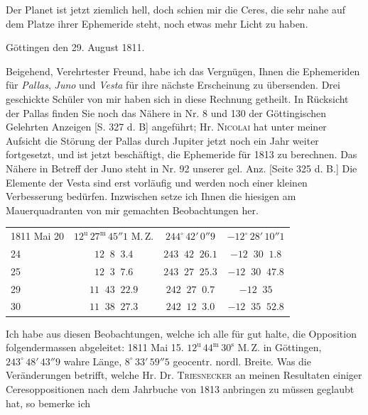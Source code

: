 \par\indent Der Planet ist jetzt ziemlich hell, doch schien mir die Ceres, die sehr nahe auf dem Platze ihrer Ephemeride steht, noch etwas mehr Licht zu haben.
\par{}\bigskip
\begin{flushright}Göttingen den 29. August 1811.\end{flushright}
\par\indent Beigehend, Verehrtester Freund, habe ich das Vergnügen, Ihnen die Ephemeriden für \emph{Pallas}, \emph{Juno} und \emph{Vesta} für ihre nächste Erscheinung zu übersenden. Drei geschickte Schüler von mir haben sich in diese Rechnung getheilt. In Rücksicht der Pallas finden Sie noch das Nähere in Nr. 8 und 130 der Göttingischen Gelehrten Anzeigen [S. 327 d. B] angeführt; Hr. \textsc{Nicolai} hat unter meiner Aufsicht die Störung der Pallas durch Jupiter jetzt noch ein Jahr weiter fortgesetzt, und ist jetzt beschäftigt, die Ephemeride für 1813 zu berechnen. Das Nähere in Betreff der Juno steht in Nr. 92 unserer gel. Anz. [Seite 325 d. B.] Die Elemente der Vesta sind erst vorläufig und werden noch einer kleinen Verbesserung bedürfen. Inzwischen setze ich Ihnen die hiesigen am Mauerquadranten von mir gemachten Beobachtungen her.
\begin{center}\fontsize{10}{12}\selectfont\setlength{\tabcolsep}{4pt}\renewcommand{\arraystretch}{1.15}
\begin{tabular}{l|c|c|c}
1811 Mai 20 & $12^{\mathrm u}\,27^{\mathrm m}\,45''1$ M.\,Z. & $244^\circ\,42'\,0''9$ & $-12^\circ\,28'\,10''1$ \\
\phantom{1811 Mai }24 & $12\;\;8\;\;3.4$ & $243\;\;42\;\;26.1$ & $-12\;\;30\;\;1.8$ \\
\phantom{1811 Mai }25 & $12\;\;3\;\;7.6$ & $243\;\;27\;\;25.3$ & $-12\;\;30\;\;47.8$ \\
\phantom{1811 Mai }29 & $11\;\;43\;\;22.9$ & $242\;\;27\;\;0.7$ & $-12\;\;35$ \\
\phantom{1811 Mai }30 & $11\;\;38\;\;27.3$ & $242\;\;12\;\;3.0$ & $-12\;\;35\;\;52.8$ \\
\end{tabular}
\end{center}


\par\indent Ich habe aus diesen Beobachtungen, welche ich alle für gut halte, die Opposition folgendermassen abgeleitet: 1811 Mai 15. $12^{\mathrm u}\,44^{\mathrm m}\,30^{\mathrm s}$ M.\,Z. in Göttingen, $243^\circ\,48'\,43''9$ wahre Länge, $8^\circ\,33'\,59''5$ geocentr. nordl. Breite. Was die Veränderungen betrifft, welche Hr. Dr. \textsc{Triesnecker} an meinen Resultaten einiger Ceresoppositionen nach dem Jahrbuche von 1813 anbringen zu müssen geglaubt hat, so bemerke ich

